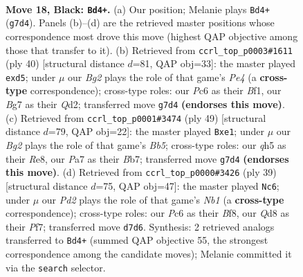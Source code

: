 \documentclass[11pt]{article}
\begin{document}
\clearpage

\begin{figure}[p]\centering
\begin{subfigure}{0.46\textwidth}\centering
\resizebox{\linewidth}{!}{%
\newchessgame
\chessboard[
  setfen={1rbqr1k1/p2pppb1/2p4B/5P1Q/P1P1B3/2N3P1/1P6/R4RK1 b - - 0 18},
  showmover=false,
  pgfstyle=straightmove, color=movearrow, markmove={g7-d4}
]}
\caption{}
\end{subfigure}\hfill
\begin{subfigure}{0.46\textwidth}\centering
\resizebox{\linewidth}{!}{%
\newchessgame
\chessboard[
  setfen={r3k3/2q1bp1p/p2p2r1/1p1b4/4Pp2/P7/1PPQ3P/1K1R1B1R w q - 0 21},
  showmover=false,
  pgfstyle=straightmove, color=movearrow, markmove={e4-d5}
]}
\caption{}
\end{subfigure}
\\[4pt]
\begin{subfigure}{0.46\textwidth}\centering
\resizebox{\linewidth}{!}{%
\newchessgame
\chessboard[
  setfen={1r1qr1k1/1bp2pp1/p6p/3pN3/1b1P1P1P/3B2P1/P1Q2P2/3RR1K1 b - - 1 25},
  showmover=false,
  pgfstyle=straightmove, color=movearrow, markmove={b4-e1}
]}
\caption{}
\end{subfigure}\hfill
\begin{subfigure}{0.46\textwidth}\centering
\resizebox{\linewidth}{!}{%
\newchessgame
\chessboard[
  setfen={1nkr1b1r/p4p2/4pP2/1q1b2B1/Npp3Q1/6P1/1P3PBP/R1R3K1 b - - 1 20},
  showmover=false,
  pgfstyle=straightmove, color=movearrow, markmove={b8-c6}
]}
\caption{}
\end{subfigure}
\caption{\textbf{Move 18, Black: \texttt{Bd4+}.} (a) Our position; Melanie plays \texttt{Bd4+} (\texttt{g7d4}). Panels (b)--(d) are the retrieved master positions whose correspondence most drove this move (highest QAP objective among those that transfer to it). (b) Retrieved from \texttt{ccrl\_top\_p0003\#1611} (ply 40) [structural distance $d$=81, QAP obj=33]: the master played \texttt{exd5}; under $\mu$ our \emph{Bg2} plays the role of that game's \emph{Pe4} (a \textbf{cross-type} correspondence); cross-type roles: our \emph{P}c6 as their \emph{B}f1, our \emph{B}g7 as their \emph{Q}d2; transferred move \texttt{g7d4} \textbf{(endorses this move)}. (c) Retrieved from \texttt{ccrl\_top\_p0001\#3474} (ply 49) [structural distance $d$=79, QAP obj=22]: the master played \texttt{Bxe1}; under $\mu$ our \emph{Bg2} plays the role of that game's \emph{Bb5}; cross-type roles: our \emph{q}h5 as their \emph{R}e8, our \emph{P}a7 as their \emph{B}b7; transferred move \texttt{g7d4} \textbf{(endorses this move)}. (d) Retrieved from \texttt{ccrl\_top\_p0000\#3426} (ply 39) [structural distance $d$=75, QAP obj=47]: the master played \texttt{Nc6}; under $\mu$ our \emph{Pd2} plays the role of that game's \emph{Nb1} (a \textbf{cross-type} correspondence); cross-type roles: our \emph{P}c6 as their \emph{B}f8, our \emph{Q}d8 as their \emph{P}f7; transferred move \texttt{d7d6}. Synthesis: 2 retrieved analogs transferred to \texttt{Bd4+} (summed QAP objective 55, the strongest correspondence among the candidate moves); Melanie committed it via the \texttt{search} selector.}
\label{fig:thought-m35}
\end{figure}
\end{document}
